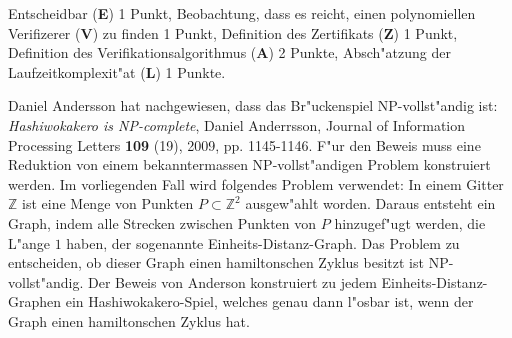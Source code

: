 \begin{bewertung}
Entscheidbar ({\bf E}) 1 Punkt,
Beobachtung, dass es reicht, einen polynomiellen Verifizerer ({\bf V})
zu finden 1 Punkt,
Definition des Zertifikats ({\bf Z}) 1 Punkt,
Definition des Verifikationsalgorithmus ({\bf A}) 2 Punkte,
Absch"atzung der Laufzeitkomplexit"at ({\bf L}) 1 Punkte.
\end{bewertung}

\begin{diskussion}
Daniel Andersson hat nachgewiesen, dass das Br"uckenspiel
NP-vollst"andig ist: {\it Hashiwokakero is NP-complete},
Daniel Anderrsson, Journal of Information Processing Letters {\bf 109} (19),
2009, pp. 1145-1146.
F"ur den Beweis muss eine Reduktion von einem bekanntermassen
NP-vollst"andigen Problem konstruiert werden.
Im vorliegenden Fall wird folgendes Problem verwendet:
In einem Gitter $\mathbb Z$ ist eine Menge von Punkten $P\subset \mathbb Z^2$
ausgew"ahlt worden.
Daraus entsteht ein Graph, indem alle Strecken zwischen Punkten von $P$
hinzugef"ugt werden, die L"ange $1$ haben,
der sogenannte Einheits-Distanz-Graph.
Das Problem zu entscheiden,
ob dieser Graph einen hamiltonschen Zyklus besitzt ist NP-vollst"andig.
Der Beweis von Anderson konstruiert zu jedem Einheits-Distanz-Graphen
ein Hashiwokakero-Spiel, welches genau dann l"osbar ist, wenn der
Graph einen hamiltonschen Zyklus hat.
\end{diskussion}

